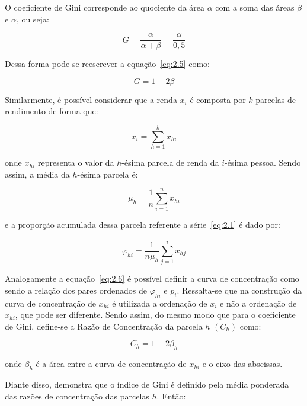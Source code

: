 O coeficiente de Gini corresponde ao quociente da área $\alpha$ com a soma das áreas $\beta$ e $\alpha$, ou seja: 

\begin{equation}
    G = \frac{\alpha}{\alpha + \beta} = \frac{\alpha}{0,5}
    \label{eq:2.5}
\end{equation}

Dessa forma pode-se reescrever a equação~\ref{eq:2.5} como:

\begin{equation}
    G = 1 - 2\beta
    \label{eq:2.6}
\end{equation}

Similarmente, é possível considerar que a renda $x_i$ é composta por $k$ parcelas de rendimento de forma que: 

\begin{equation}
    x_i = \sum_{h=1}^{k}x_{hi}
\end{equation}

\noindent onde $x_{hi}$ representa o valor da $h$-ésima parcela de renda da $i$-ésima pessoa. Sendo assim, a média da $h$-ésima parcela é:

\begin{equation}
    \mu_h = \frac{1}{n} \sum_{i=1}^{n}x_{hi}
\end{equation}

\noindent e a proporção acumulada dessa parcela referente a série~\ref{eq:2.1} é dado por:

\begin{equation}
    \varphi_{hi} = \frac{1}{n\mu_h} \sum_{j=1}^{i} x_{hj}
\end{equation}

Analogamente a equação~\ref{eq:2.6} é possível definir a curva de concentração como sendo a relação dos pares ordenados de $\varphi_{hi}$ e $p_i$. Ressalta-se que na construção da curva de concentração de $x_{hi}$ é utilizada a ordenação de $x_i$ e não a ordenação de $x_{hi}$, que pode ser diferente. Sendo assim, do mesmo modo que para o coeficiente de Gini, define-se a Razão de Concentração da parcela $h$ $(C_h)$ como:

\begin{equation}
	C_h = 1 - 2\beta_h
	\label{eq:2.10}
\end{equation}

\noindent onde $\beta_h$ é a área entre a curva de concentração de $x_{hi}$ e o eixo das abscissas.

Diante disso, \cite{cap02_ref22} demonstra que o índice de Gini é definido pela média ponderada das razões de concentração das parcelas $h$. Então:

